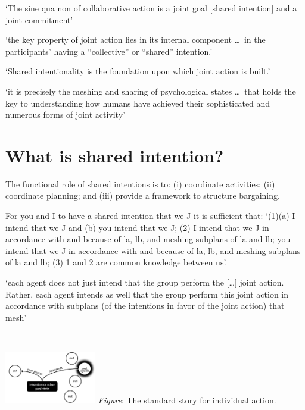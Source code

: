 \documentclass[11pt]{extarticle}
\begin{document}
\begin{multicols}{3}
`The sine qua non of collaborative action is a joint goal [shared intention] and a joint commitment’ 
\citep%
{tomasello:2008origins}

`the key property of joint action lies in its internal component \ldots \ in the participants’ having a ``collective'' or ``shared'' intention.' \citep%
{alonso_shared_2009}

`Shared intentionality is the foundation upon which joint action is built.' \citep%
{Carpenter:2009wq}

`it is precisely the meshing and sharing of psychological states \ldots \ that holds the key to understanding how humans have achieved their sophisticated and numerous forms of joint activity'
\citep%
{Call:2009fk}



\section{What is shared intention?}

The functional role of shared intentions is to: 
(i) coordinate activities; (ii) coordinate planning; and (iii) provide a framework to structure bargaining.\citep%
{Bratman:1993je}

For you and I to have a shared intention that we J it is sufficient that: `(1)(a) I intend that we J and (b) you intend that we J; (2) I intend that we J in accordance with and because of la, lb, and meshing subplans of la and lb; you intend that we J in accordance with and because of la, lb, and meshing subplans of la and lb; (3) 1 and 2 are common knowledge between us'.\citep%
{Bratman:1993je}


`each agent does not just intend that the group perform the […] joint action. Rather, each agent intends as well that the group perform this joint action in accordance with subplans (of the intentions in favor of the joint action) that mesh' \citep%
{Bratman:1992mi}




\

\begin{center}
  \includegraphics[width=0.3\textwidth]{standard_story.png}
\emph{Figure}: The standard story for individual action.
\end{center}




\end{multicols}
\end{document}
